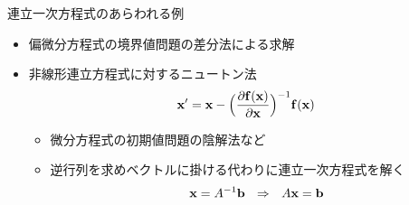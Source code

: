 \begin{frame}[t,fragile]{連立一次方程式のあらわれる例}
  \begin{itemize}
  \item 偏微分方程式の境界値問題の差分法による求解
  \item 非線形連立方程式に対するニュートン法
    \[ {\bf x}' = {\bf x} - \Big( \frac{\partial {\bf f}({\bf x})}{\partial {\bf x}} \Big)^{-1} {\bf f}({\bf x}) \]
    \begin{itemize}
    \item 微分方程式の初期値問題の陰解法など
    \item 逆行列を求めベクトルに掛ける代わりに連立一次方程式を解く
      \[ {\bf x} = A^{-1} {\bf b} \ \ \Rightarrow \ \ A {\bf x} = {\bf b} \]
    \end{itemize}
  \end{itemize}
\end{frame}
